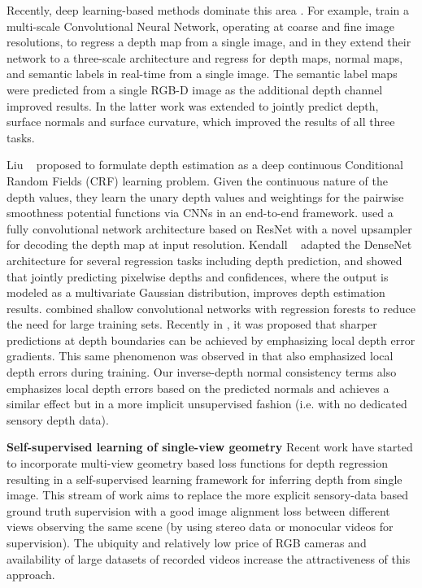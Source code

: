 \documentclass[letterpaper, 10 pt, conference]{ieeeconf}
\begin{document}
Recently, deep learning-based methods dominate this area \cite{eigen2014depth, xie2016deep3d,kendall2017uncertainties}. For example, \cite{eigen2014depth} train a multi-scale Convolutional Neural Network, operating at coarse and fine image resolutions, to regress a depth map from a single image, and in \cite{eigen2015predicting} they extend their network to a three-scale architecture and regress for depth maps, normal maps, and semantic labels in real-time from a single image. The semantic label maps were predicted from a single RGB-D image as the additional depth channel improved results. In \cite{dharmasiri2017joint} the latter work was extended to jointly predict depth, surface normals and surface curvature, which improved the results of all three tasks.

Liu \etal~\cite{liu2016learning} proposed to formulate depth estimation as a deep continuous Conditional Random Fields (CRF) learning problem. Given the continuous nature of the depth values, they learn the unary depth values and weightings for the pairwise smoothness potential functions via CNNs in an end-to-end framework. \cite{laina2016deeper} used a fully convolutional network architecture based on ResNet \cite{he2016deep} with a novel upsampler for decoding the depth map at input resolution. Kendall \etal~\cite{kendall2017uncertainties} adapted the DenseNet architecture for several regression tasks including depth prediction, and showed that jointly predicting pixelwise depths and confidences, where the output is modeled as a multivariate Gaussian distribution, improves depth estimation results. \cite{roy2016monocular} combined shallow convolutional networks with regression forests to reduce the need for large training sets. Recently in \cite{hu2018revisitingsingleview}, it was proposed that sharper predictions at depth boundaries can be achieved by emphasizing local depth error gradients. This same phenomenon was observed in \cite{eigen2015predicting,ummenhofer2017demon} that also emphasized local depth errors during training. Our inverse-depth normal consistency terms also emphasizes local depth errors based on the predicted normals and achieves a similar effect but in a more implicit unsupervised fashion (i.e. with no dedicated sensory depth data).
 






 \textbf{Self-supervised learning of single-view geometry}
Recent work have started to incorporate multi-view geometry based loss functions for depth regression resulting in a self-supervised learning framework for inferring depth from single image. This stream of work aims to replace the more explicit sensory-data based ground truth supervision with a good image alignment loss between different views observing the same scene (by using stereo data or monocular videos for supervision). The ubiquity and relatively low price of RGB cameras and availability of large datasets of recorded videos increase the attractiveness of this approach. 
\end{document}

